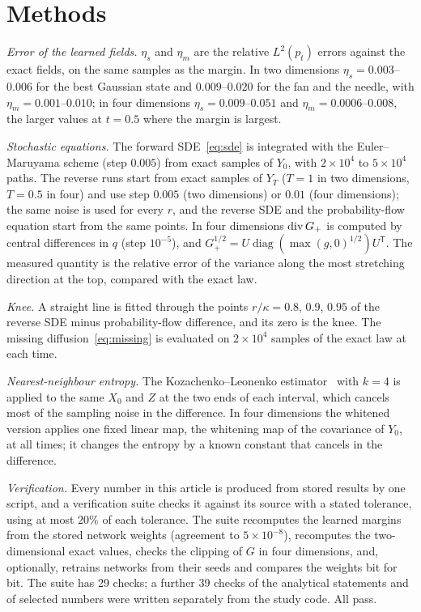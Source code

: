\section{Methods}
\label{app:methods}

\emph{Error of the learned fields.} $\eta_s$ and $\eta_m$ are the relative $L^2(p_t)$ errors against the exact fields, on the same samples as the margin. In two dimensions $\eta_s = 0.003$--$0.006$ for the best Gaussian state and $0.009$--$0.020$ for the fan and the needle, with $\eta_m = 0.001$--$0.010$; in four dimensions $\eta_s = 0.009$--$0.051$ and $\eta_m = 0.0006$--$0.008$, the larger values at $t = 0.5$ where the margin is largest.

\emph{Stochastic equations.} The forward SDE~\eqref{eq:sde} is integrated with the Euler--Maruyama scheme (step $0.005$) from exact samples of $Y_0$, with $2\times10^4$ to $5\times10^4$ paths. The reverse runs start from exact samples of $Y_T$ ($T = 1$ in two dimensions, $T = 0.5$ in four) and use step $0.005$ (two dimensions) or $0.01$ (four dimensions); the same noise is used for every $r$, and the reverse SDE and the probability-flow equation start from the same points. In four dimensions $\operatorname{div} G_+$ is computed by central differences in $q$ (step $10^{-5}$), and $G_+^{1/2} = U\operatorname{diag}(\max(g,0)^{1/2})U^{\mathsf T}$. The measured quantity is the relative error of the variance along the most stretching direction at the top, compared with the exact law.

\emph{Knee.} A straight line is fitted through the points $r/\kappa = 0.8$, $0.9$, $0.95$ of the reverse SDE minus probability-flow difference, and its zero is the knee. The missing diffusion~\eqref{eq:missing} is evaluated on $2\times10^4$ samples of the exact law at each time.

\emph{Nearest-neighbour entropy.} The Kozachenko--Leonenko estimator~\cite{kozachenko1987} with $k = 4$ is applied to the same $X_0$ and $Z$ at the two ends of each interval, which cancels most of the sampling noise in the difference. In four dimensions the whitened version applies one fixed linear map, the whitening map of the covariance of $Y_0$, at all times; it changes the entropy by a known constant that cancels in the difference.

\emph{Verification.} Every number in this article is produced from stored results by one script, and a verification suite checks it against its source with a stated tolerance, using at most $20\%$ of each tolerance. The suite recomputes the learned margins from the stored network weights (agreement to $5\times10^{-8}$), recomputes the two-dimensional exact values, checks the clipping of $G$ in four dimensions, and, optionally, retrains networks from their seeds and compares the weights bit for bit. The suite has 29 checks; a further 39 checks of the analytical statements and of selected numbers were written separately from the study code. All pass.
